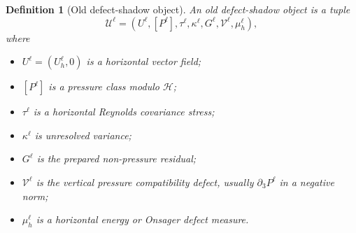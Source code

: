 \documentclass[11pt]{article}
\numberwithin{equation}{section}
\newtheorem{definition}[theorem]{Definition}
\newcommand{\calH}{\mathcal H}
\newcommand{\calU}{\mathcal U}
\newcommand{\calV}{\mathcal V}
\begin{document}
\begin{definition}[Old defect-shadow object]\label{def:old-object}
An old defect-shadow object is a tuple
\begin{equation}\label{eq:old-object-tuple}
\calU^\ell=(U^\ell,[P^\ell],\tau^\ell,\kappa^\ell,G^\ell,\calV^\ell,\mu_h^\ell),
\end{equation}
where
\begin{itemize}[leftmargin=2em]
\item \(U^\ell=(U_h^\ell,0)\) is a horizontal vector field;
\item \([P^\ell]\) is a pressure class modulo \(\calH\);
\item \(\tau^\ell\) is a horizontal Reynolds covariance stress;
\item \(\kappa^\ell\) is unresolved variance;
\item \(G^\ell\) is the prepared non-pressure residual;
\item \(\calV^\ell\) is the vertical pressure compatibility defect, usually \(\partial_3P^\ell\) in a negative norm;
\item \(\mu_h^\ell\) is a horizontal energy or Onsager defect measure.
\end{itemize}
\end{definition}
\end{document}
